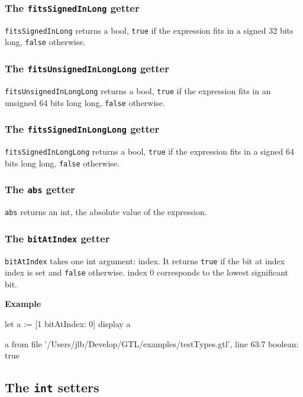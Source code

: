 \documentclass[10pt,openright,twosides,final]{memoir}
\newcommand{\gtlarg}[1]{{\footnotesize\ttfamily\colorbox{light-blue}{#1}}}
\newcommand{\gtlinline}[1]{\colorbox{light-blue}{\lstinline[language=gtl]{#1}}}
\newcommand{\example}{\vspace{.75em}\noindent\textbf{Example}\vspace{0em}}
\begin{document}
\subsubsection{The \texttt{fitsSignedInLong} getter}

\gtlinline{fitsSignedInLong} returns a bool, \gtlinline{true} if the expression fits in a signed 32 bits long, \gtlinline{false} otherwise.

\subsubsection{The \texttt{fitsUnsignedInLongLong} getter}

\gtlinline{fitsUnsignedInLongLong} returns a bool, \gtlinline{true} if the expression fits in an unsigned 64 bits long long, \gtlinline{false} otherwise.

\subsubsection{The \texttt{fitsSignedInLongLong} getter}

\gtlinline{fitsSignedInLongLong} returns a bool, \gtlinline{true} if the expression fits in a signed 64 bits long long, \gtlinline{false} otherwise.

\subsubsection{The \texttt{abs} getter}

\gtlinline{abs} returns an int, the absolute value of the expression.

\subsubsection{The \texttt{bitAtIndex} getter}

\gtlinline{bitAtIndex} takes one int argument: \gtlarg{index}. It returns \gtlinline{true} if the bit at index \gtlarg{index} is set and \gtlinline{false} otherwise. \gtlarg{index} 0 corresponds to the lowest significant bit. 

\example
\begin{gtl}
let a := [1 bitAtIndex: 0]
display a
\end{gtl}
\begin{console}
a from file '/Users/jlb/Develop/GTL/examples/testTypes.gtl', line 63:7
    boolean: true
\end{console}

\subsection{The \texttt{int} setters}
\end{document}
